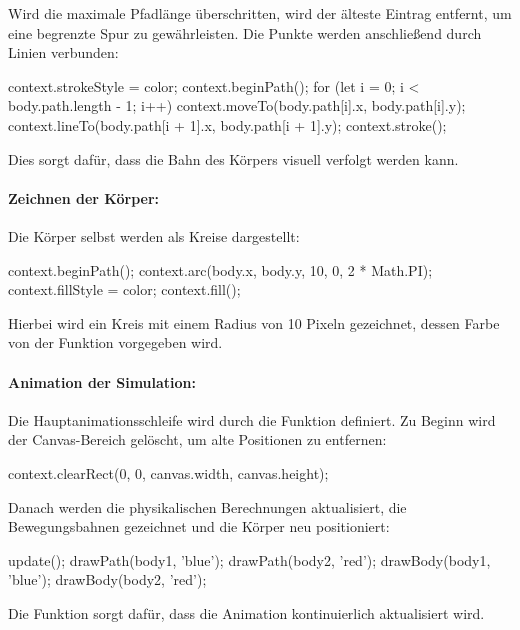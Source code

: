 \documentclass[a4paper,12pt,twoside]{article}
\begin{document}
Wird die maximale Pfadlänge überschritten, wird der älteste Eintrag entfernt, um eine begrenzte Spur zu gewährleisten. Die Punkte werden anschließend durch Linien verbunden:

\begin{javascript}
context.strokeStyle = color;
context.beginPath();
for (let i = 0; i < body.path.length - 1; i++) {
    context.moveTo(body.path[i].x, body.path[i].y);
    context.lineTo(body.path[i + 1].x, body.path[i + 1].y);
}
context.stroke();
\end{javascript}

Dies sorgt dafür, dass die Bahn des Körpers visuell verfolgt werden kann.

\paragraph{Zeichnen der Körper:}
Die Körper selbst werden als Kreise dargestellt:

\begin{javascript}
context.beginPath();
context.arc(body.x, body.y, 10, 0, 2 * Math.PI);
context.fillStyle = color;
context.fill();
\end{javascript}

Hierbei wird ein Kreis mit einem Radius von 10 Pixeln gezeichnet, dessen Farbe von der Funktion vorgegeben wird.

\paragraph{Animation der Simulation:}
Die Hauptanimationsschleife wird durch die Funktion  definiert. Zu Beginn wird der Canvas-Bereich gelöscht, um alte Positionen zu entfernen:

\begin{javascript}
context.clearRect(0, 0, canvas.width, canvas.height);
\end{javascript}

Danach werden die physikalischen Berechnungen aktualisiert, die Bewegungsbahnen gezeichnet und die Körper neu positioniert:

\begin{javascript}
update();
drawPath(body1, 'blue');
drawPath(body2, 'red');
drawBody(body1, 'blue');
drawBody(body2, 'red');
\end{javascript}

Die Funktion  sorgt dafür, dass die Animation kontinuierlich aktualisiert wird.
\end{document}
